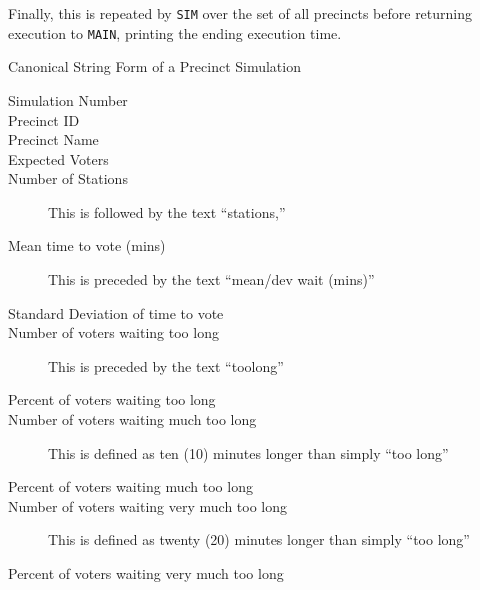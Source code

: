 Finally, this is repeated by \texttt{SIM} over the set of all precincts before returning execution to \texttt{MAIN}, printing the ending execution time.

\begin{table}[!h]
\caption{Canonical String Form of a Precinct Simulation}
\label{hxtk-canon-string-sim}
\begin{description}
\item[Simulation Number]
\item[Precinct ID]
\item[Precinct Name]
\item[Expected Voters]
\item[Number of Stations] This is followed by the text ``stations,''
\item[Mean time to vote (mins)] This is preceded by the text ``mean/dev wait (mins)''
\item[Standard Deviation of time to vote]
\item[Number of voters waiting too long] This is preceded by the text ``toolong''
\item[Percent of voters waiting too long]
\item[Number of voters waiting much too long] This is defined as ten (10) minutes longer than simply ``too long''
\item[Percent of voters waiting much too long]
\item[Number of voters waiting very much too long] This is defined as twenty (20) minutes longer than simply ``too long''
\item[Percent of voters waiting very much too long]
\end{description}
\end{table}